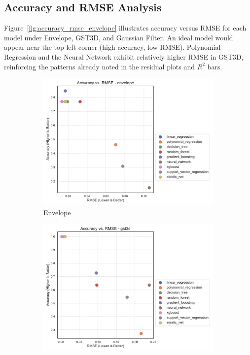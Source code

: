\subsection{Accuracy and RMSE Analysis}
\label{subsec:accuracy-and-rmse-analysis}


Figure~\ref{fig:accuracy_rmse_envelope} illustrates accuracy versus \ac{RMSE} for each model under Envelope, \ac{GST3D}, and Gaussian Filter.
An ideal model would appear near the top-left corner (high accuracy, low \ac{RMSE}).
Polynomial Regression and the Neural Network exhibit relatively higher \ac{RMSE} in \ac{GST3D}, reinforcing the patterns already noted in the residual plots and $R^2$ bars.

\begin{figure}[htbp]
    \centering
    \begin{subfigure}[t]{0.32\textwidth}
        \includegraphics[width=\textwidth]{assets/images/05/accuracy_by_rmse_per_model_envelope}
        \caption{Envelope}
    \end{subfigure}
    \hfill
    \begin{subfigure}[t]{0.32\textwidth}
        \includegraphics[width=\textwidth]{assets/images/05/accuracy_by_rmse_per_model_gst3d}

\end{subfigure}
\end{figure}
